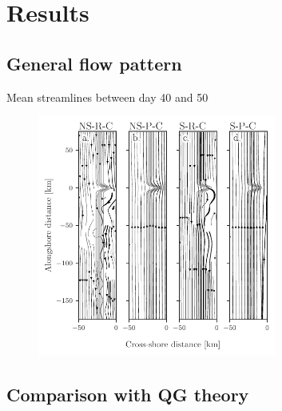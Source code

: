 \documentclass{beamer}
\begin{document}
\section{Results}

\subsection{General flow pattern}

\begin{frame}{Mean streamlines between day 40 and 50}
\begin{figure}
\centering
\includegraphics[width=0.7\textwidth]{figures/mean_streamlines_canyon_z95_40-50.pdf}
\end{figure}
\end{frame}



\subsection{Comparison with QG theory}
\end{document}
